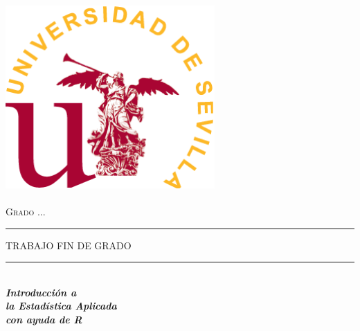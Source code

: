 \begin{titlepage}

\newcommand{\HRule}{\rule{\linewidth}{0.5mm}} %

\center %


\begin{minipage}{14cm}
\center

\includegraphics[width=8cm,height=8cm]{logo}\\[0.5cm] %


\textsc{\LARGE Grado ...}\\[2.5cm] 



\rule[1.7mm]{2cm}{0.5mm}
\hfill
\textsc{\Large TRABAJO FIN DE GRADO} 
\hfill
\rule[1.7mm]{2cm}{0.5mm} 
\\[0.75cm]

{\Huge
\textbf{\textit{
Introducción a \\[0.2cm]
la Estadística Aplicada \\[0.5cm]
con ayuda de R
}}}\\[0.75cm] 


\end{minipage}
\end{titlepage}
